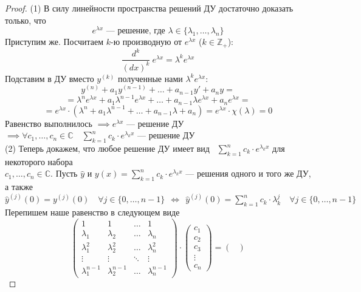 \documentclass[11pt]{article}
\begin{document}
\begin{proof}
  (1) В силу линейности пространства решений ДУ достаточно доказать только, что 
  \[e^{\lambda x} \text{ --- решение, где } \lambda \in \{\lambda_1, \ldots, \lambda_n\}\]
  Приступим же. Посчитаем $k$-ю производную от $e^{\lambda x}$ ($k \in \mathbb{Z}_+$): 
  \[\frac{d^k}{(d x)^k} \ e^{\lambda x} = \lambda^k e^{\lambda x}\]
  Подставим в ДУ вместо $y^{(k)}$ полученные нами $\lambda^k e^{\lambda x}$:
  \[y^{(n)} + a_1 y^{(n - 1)} + \ldots + a_{n - 1} y' + a_n y = \]
  \[= \lambda^n e^{\lambda x} + a_1\lambda^{n - 1} e^{\lambda x} + \ldots + a_{n - 1}\lambda e^{\lambda x} + a_n e^{\lambda x} =\]
  \[= e^{\lambda x} \cdot (\lambda^n + a_1\lambda^{n - 1} + \ldots + a_{n - 1}\lambda + a_n) = e^{\lambda x} \cdot \chi(\lambda) = 0\]
  Равенство выполнилось $\implies e^{\lambda x}$ --- решение ДУ $\implies \forall c_1, \ldots, c_n \in \mathbb{C} \quad \displaystyle \sum_{k = 1}^{n} c_k \cdot e^{\lambda_kx}$ --- решение ДУ \\
  (2) Теперь докажем, что любое решение ДУ имеет вид \ $\displaystyle \sum_{k = 1}^{n} c_k \cdot e^{\lambda_kx}$ для некоторого набора \\
  $c_1, \ldots, c_n \in \mathbb{C}$. Пусть $\widehat{y}$ и $y(x) = \displaystyle \sum_{k = 1}^{n} c_k \cdot e^{\lambda_kx}$ --- решения одного и того же ДУ, а также \\
  $\widehat{y}^{(j)}(0) = y^{(j)}(0) \quad \forall j \in \{0, \ldots, n - 1\} \ \ \Longleftrightarrow \ \ \widehat{y}^{(j)}(0) = \displaystyle \sum_{k = 1}^{n} c_k \cdot \lambda_k^j \quad \forall j \in \{0, \ldots, n - 1\}$ \\
  Перепишем наше равенство в следующем виде
  \[
  \begin{pmatrix}
    1 & 1 & \ldots & 1 \\
    \lambda_1 & \lambda_2 & \ldots & \lambda_n \\
    \lambda_1^2 & \lambda_2^2 & \ldots & \lambda_n^2 \\
    \vdots & \vdots & \ddots & \vdots \\
    \lambda_1^{n - 1} & \lambda_2^{n - 1} & \ldots & \lambda_n^{n - 1}
  \end{pmatrix}
  \cdot
  \begin{pmatrix}
    c_1 \\
    c_2 \\
    c_3 \\
    \vdots \\
    c_n
  \end{pmatrix}
  =
  \begin{pmatrix}

\end{pmatrix}\]
\end{proof}
\end{document}

